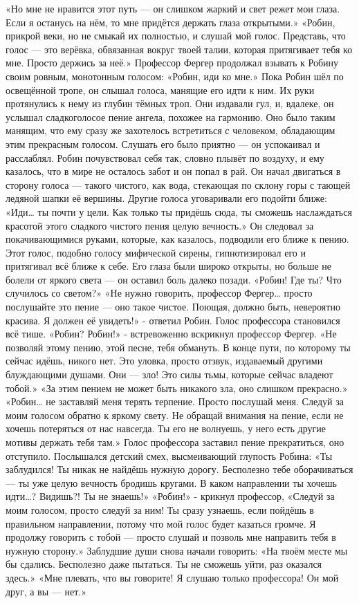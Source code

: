 \documentclass[a4paper,12pt]{book}
\begin{document}
	«Но мне не нравится этот путь — он слишком жаркий и свет режет мои глаза. Если я останусь на нём, то мне придётся держать глаза открытыми.»
	«Робин, прикрой веки, но не смыкай их полностью, и слушай мой голос. Представь, что голос — это верёвка, обвязанная вокруг твоей талии, которая притягивает тебя ко мне. Просто держись за неё.»
	Профессор Фергер продолжал взывать к Робину своим ровным, монотонным голосом:
	«Робин, иди ко мне.»
	Пока Робин шёл по освещённой тропе, он слышал голоса, манящие его идти к ним. Их руки протянулись к нему из глубин тёмных троп. Они издавали гул, и, вдалеке, он услышал сладкоголосое пение ангела, похожее на гармонию. Оно было таким манящим, что ему сразу же захотелось встретиться с человеком, обладающим этим прекрасным голосом. Слушать его было приятно — он успокаивал и расслаблял. Робин почувствовал себя так, словно плывёт по воздуху, и ему казалось, что в мире не осталось забот и он попал в рай.
	Он начал двигаться в сторону голоса — такого чистого, как вода, стекающая по склону горы с тающей ледяной шапки её вершины. Другие голоса уговаривали его подойти ближе:
	«Иди… ты почти у цели. Как только ты придёшь сюда, ты сможешь наслаждаться красотой этого сладкого чистого пения целую вечность.»
	Он следовал за покачивающимися руками, которые, как казалось, подводили его ближе к пению. Этот голос, подобно голосу мифической сирены, гипнотизировал его и притягивал всё ближе к себе. Его глаза были широко открыты, но больше не болели от яркого света — он оставил боль далеко позади.
	«Робин! Где ты? Что случилось со светом?»
	«Не нужно говорить, профессор Фергер… просто послушайте это пение — оно такое чистое. Поющая, должно быть, невероятно красива. Я должен её увидеть!» - ответил Робин.
	Голос профессора становился всё тише.
	«Робин? Робин!» - встревоженно вскрикнул профессор Фергер.
	«Не позволяй этому пению, этой песне, тебя обмануть. В конце пути, по которому ты сейчас идёшь, никого нет. Это уловка, просто отзвук, издаваемый другими блуждающими душами. Они — зло! Это силы тьмы, которые сейчас владеют тобой.»
	«За этим пением не может быть никакого зла, оно слишком прекрасно.»
	«Робин… не заставляй меня терять терпение. Просто послушай меня. Следуй за моим голосом обратно к яркому свету. Не обращай внимания на пение, если не хочешь потеряться от нас навсегда. Ты его не волнуешь, у него есть другие мотивы держать тебя там.»
	Голос профессора заставил пение прекратиться, оно отступило. Послышался детский смех, высмеивающий глупость Робина:
	«Ты заблудился! Ты никак не найдёшь нужную дорогу. Бесполезно тебе оборачиваться — ты уже целую вечность бродишь кругами. В каком направлении ты хочешь идти…? Видишь?! Ты не знаешь!»
	«Робин!» - крикнул профессор,
	«Следуй за моим голосом, просто следуй за ним! Ты сразу узнаешь, если пойдёшь в правильном направлении, потому что мой голос будет казаться громче. Я продолжу говорить с тобой — просто слушай и позволь мне направить тебя в нужную сторону.»
	Заблудшие души снова начали говорить:
	«На твоём месте мы бы сдались. Бесполезно даже пытаться. Ты не сможешь уйти, раз оказался здесь.»
	«Мне плевать, что вы говорите! Я слушаю только профессора! Он мой друг, а вы — нет.»
\end{document}
